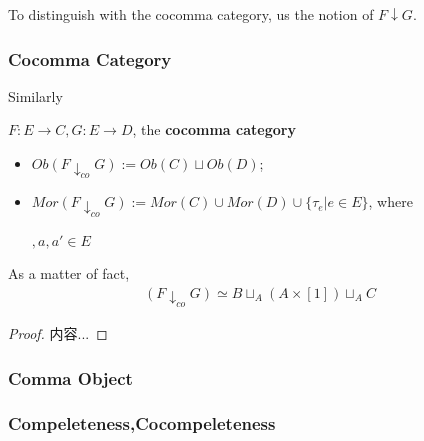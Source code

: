 \documentclass[Total.tex]{subfiles}
\begin{document}
				
				To distinguish with the cocomma category, us the notion of $F\downarrow G$. 
				\subsubsection{Cocomma Category}
				
					Similarly
					
					\begin{Def}
						$F:E\rightarrow C,G:E\rightarrow D$, the \textbf{cocomma category}
						\begin{itemize}
							\item $Ob(F\downarrow_{co}  G):=Ob(C)\sqcup Ob(D)$;
							\item $Mor(F\downarrow_{co} G):=Mor(C)\cup Mor(D)\cup \{\tau_e|e\in E\}$, where
							\begin{center}
								$,a,a'\in E$
							\end{center}
							
						\end{itemize}
					\end{Def}
					
					\begin{proposition}
						As a matter of fact, 
						\begin{gather*}
							(F\downarrow_{co} G)\simeq B\sqcup_A (A\times [1])\sqcup_A C
						\end{gather*}
					\end{proposition}
					\begin{proof}
						内容...
					\end{proof}
				\subsubsection{Comma Object}
				\subsubsection{Compeleteness,Cocompeleteness}
\end{document}
